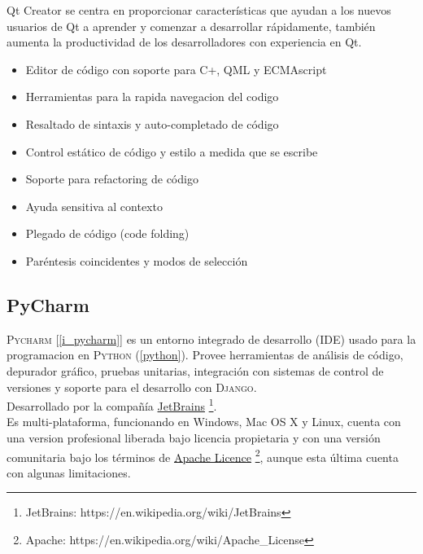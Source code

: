 \documentclass[12pt]{book} %
\begin{document}
		Qt Creator se centra en proporcionar características que ayudan a los nuevos usuarios de Qt a aprender y comenzar a desarrollar
		rápidamente, también aumenta la productividad de los desarrolladores con experiencia en Qt.
		\begin{multicols}{2}
		\begin{itemize}
			\item Editor de código con soporte para C+, QML y ECMAscript
			\item Herramientas para la rapida navegacion del codigo
	    	\item Resaltado de sintaxis y auto-completado de código
			\item Control estático de código y estilo a medida que se escribe
		    \item Soporte para refactoring de código
	    	\item Ayuda sensitiva al contexto
		    \item Plegado de código (code folding)
	    	\item Paréntesis coincidentes y modos de selección
		\end{itemize}
		\end{multicols}
	
	\subsection{PyCharm \label{pych}}
		\textsc{Pycharm} [\ref{i_pycharm}] es un entorno integrado de desarrollo (\textsc{IDE}) usado para la programacion en \textsc{Python} 
		(\ref{python}). 
		Provee herramientas de análisis de código, depurador gráfico, pruebas unitarias, integración con sistemas de control de versiones
		y soporte para el desarrollo con \textsc{Django}.\\
		Desarrollado por la compañía \href{https://en.wikipedia.org/wiki/JetBrains}{JetBrains}
		\footnote{\scriptsize JetBrains: https://en.wikipedia.org/wiki/JetBrains}.\\
		
		Es multi-plataforma, funcionando en Windows, Mac OS X y Linux, cuenta con una version profesional liberada bajo licencia 
		propietaria y con una versión comunitaria bajo los términos de \href {https://en.wikipedia.org/wiki/Apache_License}{Apache Licence}
		\footnote{\scriptsize Apache: https://en.wikipedia.org/wiki/Apache\_License}, aunque esta última cuenta con algunas limitaciones.\\
		
\end{document}
